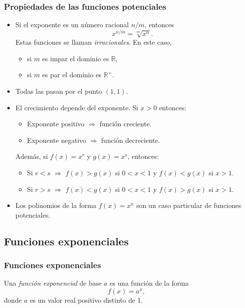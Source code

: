 \begin{frame}
\frametitle{Propiedades de las funciones potenciales}
\begin{itemize}
\item Si el exponente es un número racional $n/m$, entonces 
\[x^{n/m}=\sqrt[m]{x^n}.\]
Estas funciones se llaman \emph{irracionales}. En este caso, 
\begin{itemize}
\item si $m$ es impar el dominio es $\mathbb{R}$,
\item si $m$ es par el dominio es $\mathbb{R}^+$.
\end{itemize}
\item Todas las pasan por el punto $(1,1)$.
\item El crecimiento depende del exponente. Si $x>0$ entonces:
\begin{itemize}
\item Exponente positivo $\Rightarrow$ función creciente.
\item Exponente negativo $\Rightarrow$ función decreciente. 
\end{itemize}
Además, si $f(x)=x^r$ y $g(x)=x^s$, entonces:
\begin{itemize}
\item Si $r<s$ $\Rightarrow$ $f(x)>g(x)$ si $0<x<1$ y $f(x)<g(x)$ si $x>1$.
\item Si $r>s$ $\Rightarrow$ $f(x)<g(x)$ si $0<x<1$ y $f(x)>g(x)$ si $x>1$.
\end{itemize}

\item Los polinomios de la forma $f(x)=x^n$ son un caso particular de funciones potenciales. 
\end{itemize}
\end{frame} 



\subsection{Funciones exponenciales}
\begin{frame}
\frametitle{Funciones exponenciales}
\begin{definicion}
Una \emph{función exponencial} de base $a$ es una función de la forma
\[
f(x)=a^x,
\]
donde $a$ es un valor real positivo distinto de 1.
\end{definicion}
\begin{center}
\scalebox{1}{}
\end{center}
\end{frame} 


